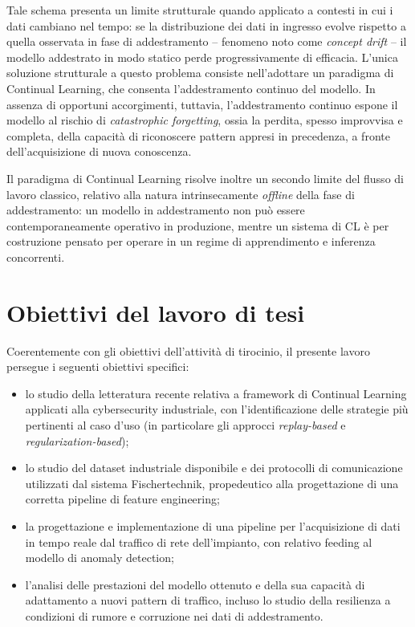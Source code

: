 \documentclass[12pt,a4paper]{report}
\begin{document}
Tale schema presenta un limite strutturale quando applicato a contesti in cui i dati cambiano nel tempo: se la distribuzione dei dati in ingresso evolve rispetto a quella osservata in fase di addestramento -- fenomeno noto come \emph{concept drift} -- il modello addestrato in modo statico perde progressivamente di efficacia. L'unica soluzione strutturale a questo problema consiste nell'adottare un paradigma di Continual Learning, che consenta l'addestramento continuo del modello. In assenza di opportuni accorgimenti, tuttavia, l'addestramento continuo espone il modello al rischio di \emph{catastrophic forgetting}, ossia la perdita, spesso improvvisa e completa, della capacità di riconoscere pattern appresi in precedenza, a fronte dell'acquisizione di nuova conoscenza.

Il paradigma di Continual Learning risolve inoltre un secondo limite del flusso di lavoro classico, relativo alla natura intrinsecamente \emph{offline} della fase di addestramento: un modello in addestramento non può essere contemporaneamente operativo in produzione, mentre un sistema di CL è per costruzione pensato per operare in un regime di apprendimento e inferenza concorrenti.

\section{Obiettivi del lavoro di tesi}

Coerentemente con gli obiettivi dell'attività di tirocinio, il presente lavoro persegue i seguenti obiettivi specifici:

\begin{itemize}
    \item lo studio della letteratura recente relativa a framework di Continual Learning applicati alla cybersecurity industriale, con l'identificazione delle strategie più pertinenti al caso d'uso (in particolare gli approcci \emph{replay-based} e \emph{regularization-based});
    \item lo studio del dataset industriale disponibile e dei protocolli di comunicazione utilizzati dal sistema Fischertechnik, propedeutico alla progettazione di una corretta pipeline di feature engineering;
    \item la progettazione e implementazione di una pipeline per l'acquisizione di dati in tempo reale dal traffico di rete dell'impianto, con relativo feeding al modello di anomaly detection;
    \item l'analisi delle prestazioni del modello ottenuto e della sua capacità di adattamento a nuovi pattern di traffico, incluso lo studio della resilienza a condizioni di rumore e corruzione nei dati di addestramento.
\end{itemize}
\end{document}
